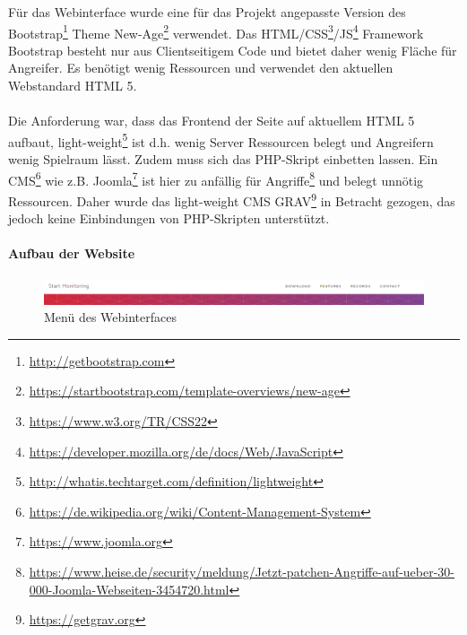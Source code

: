 F\"ur das Webinterface wurde eine f\"ur das Projekt angepasste Version des Bootstrap\footnote{\hyperlink{http://getbootstrap.com/}{http://getbootstrap.com}} Theme New-Age\footnote{\hyperlink{https://startbootstrap.com/template-overviews/new-age/}{https://startbootstrap.com/template-overviews/new-age}} verwendet. Das HTML/CSS\footnote{\hyperlink{https://www.w3.org/TR/CSS22/}{https://www.w3.org/TR/CSS22}}/JS\footnote{\hyperlink{https://developer.mozilla.org/de/docs/Web/JavaScript}{https://developer.mozilla.org/de/docs/Web/JavaScript}} Framework Bootstrap besteht nur aus Clientseitigem Code und bietet daher wenig Fl\"ache f\"ur Angreifer. Es ben\"otigt wenig Ressourcen und verwendet den aktuellen Webstandard HTML 5.\\
\\
Die Anforderung war, dass das Frontend der Seite auf aktuellem HTML 5 aufbaut, light-weight\footnote{\hyperlink{http://whatis.techtarget.com/definition/lightweight}{http://whatis.techtarget.com/definition/lightweight}} ist d.h. wenig Server Ressourcen belegt und Angreifern wenig Spielraum l\"asst. Zudem muss sich das PHP-Skript einbetten lassen. Ein CMS\footnote{\hyperlink{https://de.wikipedia.org/wiki/Content-Management-System}{https://de.wikipedia.org/wiki/Content-Management-System}} wie z.B. Joomla\footnote{\hyperlink{https://www.joomla.org}{https://www.joomla.org}} ist hier zu anf\"allig f\"ur Angriffe\footnote{\hyperlink{https://www.heise.de/security/meldung/Jetzt-patchen-Angriffe-auf-ueber-30-000-Joomla-Webseiten-3454720.html}{https://www.heise.de/security/meldung/Jetzt-patchen-Angriffe-auf-ueber-30-000-Joomla-Webseiten-3454720.html}} und belegt unn\"otig Ressourcen. Daher wurde das light-weight CMS GRAV\footnote{\hyperlink{https://getgrav.org/}{https://getgrav.org}} in Betracht gezogen, das jedoch keine Einbindungen von PHP-Skripten unterst\"utzt. \\

\paragraph{Aufbau der Website}


\begin{figure}[htb]
  \centering
    \includegraphics[width=1.0\textwidth]{images/webmenu}
    \caption{Men\"u des Webinterfaces}
\end{figure}

